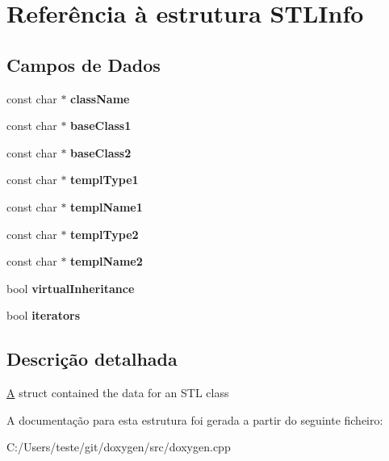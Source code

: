 \hypertarget{struct_s_t_l_info}{\section{Referência à estrutura S\-T\-L\-Info}
\label{struct_s_t_l_info}
}
\subsection*{Campos de Dados}
\begin{DoxyCompactItemize}
\item 
\hypertarget{struct_s_t_l_info_a43ff489793a22a8e71664f7b5cadf1a3}{const char $\ast$ {\bfseries class\-Name}}\label{struct_s_t_l_info_a43ff489793a22a8e71664f7b5cadf1a3}

\item 
\hypertarget{struct_s_t_l_info_a9fc347a51e7816f8689cefd5e8425fb3}{const char $\ast$ {\bfseries base\-Class1}}\label{struct_s_t_l_info_a9fc347a51e7816f8689cefd5e8425fb3}

\item 
\hypertarget{struct_s_t_l_info_af1bc2eefa3181ed4cfc8e30bd487227c}{const char $\ast$ {\bfseries base\-Class2}}\label{struct_s_t_l_info_af1bc2eefa3181ed4cfc8e30bd487227c}

\item 
\hypertarget{struct_s_t_l_info_ac6b20175efc65863be391c53aa0597fa}{const char $\ast$ {\bfseries templ\-Type1}}\label{struct_s_t_l_info_ac6b20175efc65863be391c53aa0597fa}

\item 
\hypertarget{struct_s_t_l_info_aa8da69b485a7ccd817dcbd499d87024d}{const char $\ast$ {\bfseries templ\-Name1}}\label{struct_s_t_l_info_aa8da69b485a7ccd817dcbd499d87024d}

\item 
\hypertarget{struct_s_t_l_info_a513d07dc24d09d0c434cebd47c5c418a}{const char $\ast$ {\bfseries templ\-Type2}}\label{struct_s_t_l_info_a513d07dc24d09d0c434cebd47c5c418a}

\item 
\hypertarget{struct_s_t_l_info_ac791c76389074378b16af7f8ebca6a51}{const char $\ast$ {\bfseries templ\-Name2}}\label{struct_s_t_l_info_ac791c76389074378b16af7f8ebca6a51}

\item 
\hypertarget{struct_s_t_l_info_a063c626e08cfd9084c2e246f48047951}{bool {\bfseries virtual\-Inheritance}}\label{struct_s_t_l_info_a063c626e08cfd9084c2e246f48047951}

\item 
\hypertarget{struct_s_t_l_info_afbd069c00e0ed57baeea32694a5c1685}{bool {\bfseries iterators}}\label{struct_s_t_l_info_afbd069c00e0ed57baeea32694a5c1685}

\end{DoxyCompactItemize}


\subsection{Descrição detalhada}
\hyperlink{class_a}{A} struct contained the data for an S\-T\-L class 

A documentação para esta estrutura foi gerada a partir do seguinte ficheiro\-:\begin{DoxyCompactItemize}
\item 
C\-:/\-Users/teste/git/doxygen/src/doxygen.\-cpp\end{DoxyCompactItemize}
